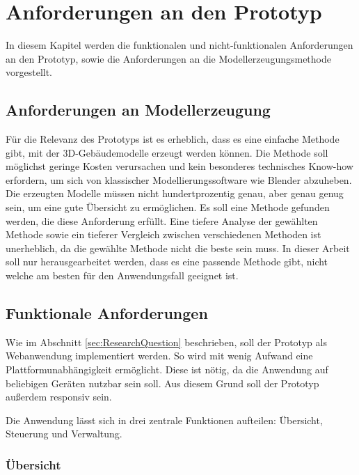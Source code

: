 \newpage
\section{Anforderungen an den Prototyp}\label{sec:Requirements}
In diesem Kapitel werden die funktionalen und nicht-funktionalen Anforderungen an den Prototyp, sowie die Anforderungen an die Modellerzeugungsmethode vorgestellt.

\subsection{Anforderungen an Modellerzeugung}

Für die Relevanz des Prototyps ist es erheblich, dass es eine einfache Methode gibt, mit der 3D-Gebäudemodelle erzeugt werden können. Die Methode soll möglichst geringe Kosten verursachen und kein besonderes technisches Know-how erfordern, um sich von klassischer Modellierungssoftware wie Blender abzuheben. Die erzeugten Modelle müssen nicht hundertprozentig genau, aber genau genug sein, um eine gute Übersicht zu ermöglichen. Es soll eine Methode gefunden werden, die diese Anforderung erfüllt. Eine tiefere Analyse der gewählten Methode sowie ein tieferer Vergleich zwischen verschiedenen Methoden ist unerheblich, da die gewählte Methode nicht die beste sein muss. In dieser Arbeit soll nur herausgearbeitet werden, dass es eine passende Methode gibt, nicht welche am besten für den Anwendungsfall geeignet ist.

\subsection{Funktionale Anforderungen}\label{sec:FunctionalRequirements}
Wie im Abschnitt \ref{sec:ResearchQuestion} beschrieben, soll der Prototyp als Webanwendung implementiert werden. So wird mit wenig Aufwand eine Plattformunabhängigkeit ermöglicht. Diese ist nötig, da die Anwendung auf beliebigen Geräten nutzbar sein soll. Aus diesem Grund soll der Prototyp außerdem responsiv sein.

Die Anwendung lässt sich in drei zentrale Funktionen aufteilen: Übersicht, Steuerung und Verwaltung.

\subsubsection{Übersicht}

